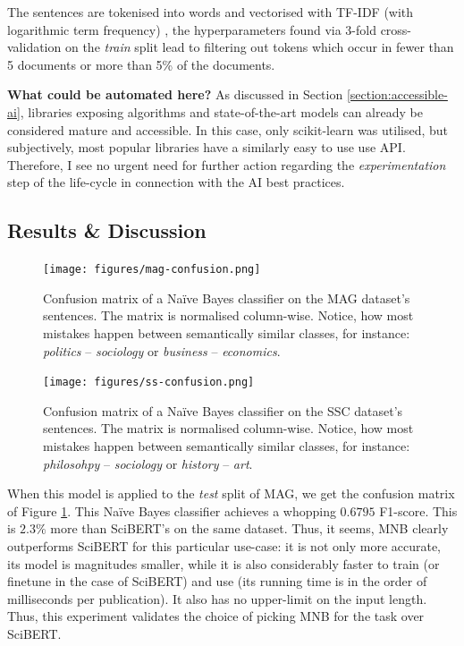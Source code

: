 The sentences are tokenised into words and vectorised with TF-IDF (with logarithmic term frequency) \cite{buckley1985implementation}, the hyperparameters found via 3-fold cross-validation on the \textit{train} split lead to filtering out tokens which occur in fewer than 5 documents or more than 5\% of the documents.

\begin{displayquote}
\textbf{What could be automated here?} As discussed in Section \ref{section:accessible-ai}, libraries exposing algorithms and state-of-the-art models can already be considered mature and accessible. In this case, only scikit-learn was utilised, but subjectively, most popular libraries have a similarly easy to use use API. Therefore, I see no urgent need for further action regarding the \textit{experimentation} step of the life-cycle in connection with the AI best practices.
\end{displayquote}

\subsection{Results \& Discussion}

\begin{figure}
    \centering
    \texttt{[image: figures/mag-confusion.png]}
    \caption{Confusion matrix of a Naïve Bayes classifier on the MAG dataset's sentences. The matrix is normalised column-wise. Notice, how most mistakes happen between semantically similar classes, for instance: \textit{politics} -- \textit{sociology} or \textit{business} -- \textit{economics}.}
    \label{fig:mag-confusion}
\end{figure}

\begin{figure}
    \centering
    \texttt{[image: figures/ss-confusion.png]}
    \caption{Confusion matrix of a Naïve Bayes classifier on the SSC dataset's sentences. The matrix is normalised column-wise. Notice, how most mistakes happen between semantically similar classes, for instance:  \textit{philosohpy} -- \textit{sociology} or \textit{history} -- \textit{art}.}
    \label{fig:ss-confusion}
\end{figure}

When this model is applied to the \textit{test} split of MAG, we get the confusion matrix of Figure \ref{fig:mag-confusion}. This Naïve Bayes classifier achieves a whopping $0.6795$ F1-score. This is $2.3\%$ more than SciBERT's on the same dataset. Thus, it seems, MNB clearly outperforms SciBERT for this particular use-case: it is not only more accurate, its model is magnitudes smaller, while it is also considerably faster to train (or finetune in the case of SciBERT) and use (its running time is in the order of milliseconds per publication). It also has no upper-limit on the input length. Thus, this experiment validates the choice of picking MNB for the task over SciBERT.

